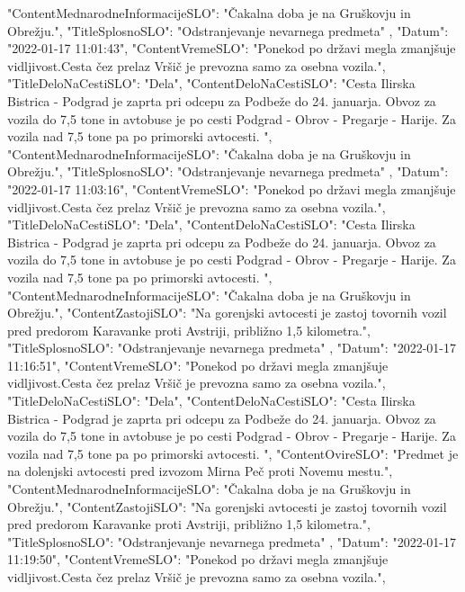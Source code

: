 \documentclass[fleqn,moreauthors,10pt]{ds_report}
\begin{document}
\begin{scriptsize}
{        "ContentMednarodneInformacijeSLO": "Čakalna doba je na Gruškovju in Obrežju.",
        "TitleSplosnoSLO": "Odstranjevanje nevarnega predmeta"
    },
    {
        "Datum": "2022-01-17 11:01:43",
        "ContentVremeSLO": "Ponekod po državi megla zmanjšuje vidljivost.Cesta čez prelaz Vršič je prevozna samo za osebna vozila.",
        "TitleDeloNaCestiSLO": "Dela",
        "ContentDeloNaCestiSLO": "Cesta Ilirska Bistrica - Podgrad je zaprta pri odcepu za Podbeže do 24. januarja. Obvoz za vozila do 7,5 tone in avtobuse je po cesti Podgrad - Obrov - Pregarje - Harije. Za vozila nad 7,5 tone pa po primorski avtocesti. ",
        "ContentMednarodneInformacijeSLO": "Čakalna doba je na Gruškovju in Obrežju.",
        "TitleSplosnoSLO": "Odstranjevanje nevarnega predmeta"
    },
    {
        "Datum": "2022-01-17 11:03:16",
        "ContentVremeSLO": "Ponekod po državi megla zmanjšuje vidljivost.Cesta čez prelaz Vršič je prevozna samo za osebna vozila.",
        "TitleDeloNaCestiSLO": "Dela",
        "ContentDeloNaCestiSLO": "Cesta Ilirska Bistrica - Podgrad je zaprta pri odcepu za Podbeže do 24. januarja. Obvoz za vozila do 7,5 tone in avtobuse je po cesti Podgrad - Obrov - Pregarje - Harije. Za vozila nad 7,5 tone pa po primorski avtocesti. ",
        "ContentMednarodneInformacijeSLO": "Čakalna doba je na Gruškovju in Obrežju.",
        "ContentZastojiSLO": "Na gorenjski avtocesti je zastoj tovornih vozil pred predorom Karavanke proti Avstriji, približno 1,5 kilometra.",
        "TitleSplosnoSLO": "Odstranjevanje nevarnega predmeta"
    },
    {
        "Datum": "2022-01-17 11:16:51",
        "ContentVremeSLO": "Ponekod po državi megla zmanjšuje vidljivost.Cesta čez prelaz Vršič je prevozna samo za osebna vozila.",
        "TitleDeloNaCestiSLO": "Dela",
        "ContentDeloNaCestiSLO": "Cesta Ilirska Bistrica - Podgrad je zaprta pri odcepu za Podbeže do 24. januarja. Obvoz za vozila do 7,5 tone in avtobuse je po cesti Podgrad - Obrov - Pregarje - Harije. Za vozila nad 7,5 tone pa po primorski avtocesti. ",
        "ContentOvireSLO": "Predmet je na dolenjski avtocesti pred izvozom Mirna Peč proti Novemu mestu.",
        "ContentMednarodneInformacijeSLO": "Čakalna doba je na Gruškovju in Obrežju.",
        "ContentZastojiSLO": "Na gorenjski avtocesti je zastoj tovornih vozil pred predorom Karavanke proti Avstriji, približno 1,5 kilometra.",
        "TitleSplosnoSLO": "Odstranjevanje nevarnega predmeta"
    },
    {
        "Datum": "2022-01-17 11:19:50",
        "ContentVremeSLO": "Ponekod po državi megla zmanjšuje vidljivost.Cesta čez prelaz Vršič je prevozna samo za osebna vozila.",
}
\end{scriptsize}
\end{document}
